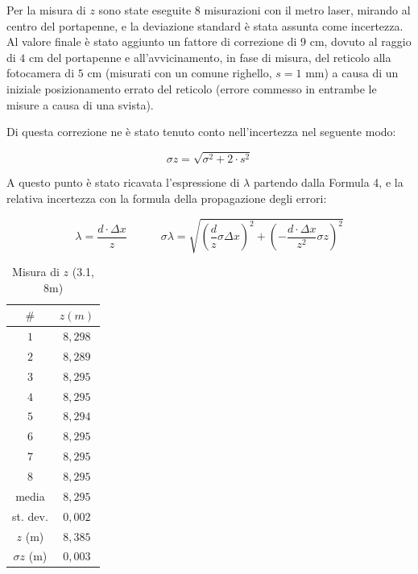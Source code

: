 \documentclass{article}
\begin{document}
\vspace{3mm}

Per la misura di $z$ sono state eseguite 8 misurazioni con il metro laser, mirando al centro del portapenne, e la deviazione standard è stata assunta come incertezza. Al valore finale è stato aggiunto un fattore di correzione di $9$ cm, dovuto al raggio di $4$ cm del portapenne e all'avvicinamento, in fase di misura, del reticolo alla fotocamera di $5$ cm (misurati con un comune righello, $s = 1$ mm) a causa di un iniziale posizionamento errato del reticolo (errore commesso in entrambe le misure a causa di una svista).

\vspace{5mm}

Di questa correzione ne è stato tenuto conto nell'incertezza nel seguente modo:

\[\sigma z = \sqrt{ \sigma^2 + 2\cdot s^2}\]

A questo punto è stato ricavata l'espressione di $\lambda$ partendo dalla Formula 4, e la relativa incertezza con la formula della propagazione degli errori:

\[\lambda = \frac{d \cdot \Delta x}{z} \quad \quad \quad \sigma \lambda = \sqrt{\left( \frac{d}{z} \sigma \Delta x \right)^2 + \left( -\frac{d \cdot \Delta x}{z^2}\sigma z \right)^2}\]

\begin{table}
\centering
\begin{tabular}{ | c | c | }
  \hline
  $\#$ & $z (m)$ \\
  \hline
  $1$ & $8,298$ \\
  $2$ & $8,289$ \\
  $3$ & $8,295$ \\
  $4$ & $8,295$ \\
  $5$ & $8,294$ \\
  $6$ & $8,295$ \\
  $7$ & $8,295$ \\
  $8$ & $8,295$ \\
  \hline 
  media & $8,295$ \\
  st. dev. & $0,002$ \\
  \hline
  $z$ (m) & $8,385$ \\
  $\sigma z$ (m) & $0,003$ \\
  \hline
\end{tabular}
\caption{Misura di $z$ (3.1, 8m)}
\end{table}
\end{document}
